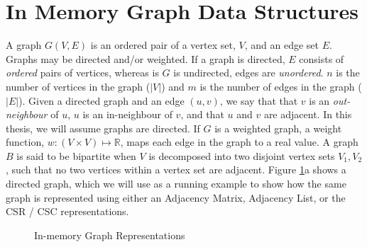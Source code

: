 \section{In Memory Graph Data Structures}


A graph $G(V, E)$ is an ordered pair of a vertex set, $V$, and an edge set $E$. Graphs may be directed and/or weighted. If a graph is directed, $E$ consists of \textit{ordered} pairs of vertices, whereas is $G$ is undirected, edges are \textit{unordered}.
$n$ is the number of vertices in the graph ($|V|$) and $m$ is the number of edges in the graph ($|E|$).
Given a directed graph and an edge $(u,v)$, we say that that $v$ is an \textit{out-neighbour} of $u$, $u$ is an in-neighbour of $v$, and that $u$ and $v$ are adjacent. In this thesis, we will assume graphs are directed.
If $G$ is a weighted graph, a weight function, $w: (V \times V) \mapsto \mathbb{R}$, maps each edge in the graph to a real value. A graph $B$ is said to be bipartite when $V$ is decomposed into two disjoint vertex sets $V_1, V_2$, such that no two vertices within a vertex set are adjacent.
Figure \ref{fig:graph_example}a shows a directed graph, which we will use as a running example to show how the same graph is represented using either an Adjacency Matrix, Adjacency List, or the \ac{CSR} / \ac{CSC} representations.



\begin{figure}[!htb]
    \begin{adjustwidth}{-0.75in}{-0.75in}
        \centering
        
        \caption{
            In-memory Graph Representations
        }
        \label{fig:graph_example}   %
    \end{adjustwidth}
\end{figure}

